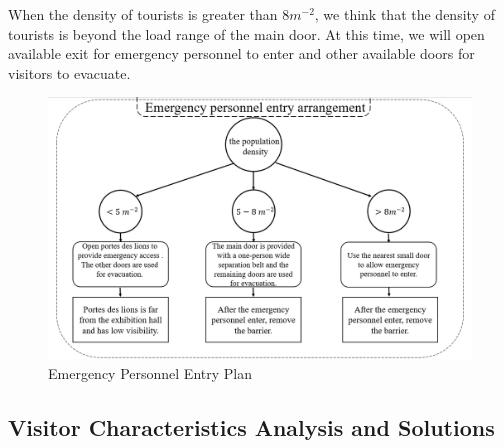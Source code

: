 When the density of tourists is greater than $8m^{-2}$, we think that the density of tourists is beyond the load range of the main door. At this time, we will open available exit for emergency personnel to enter and other available doors for visitors to evacuate.
\begin{figure}[ht]
    \centering
    \includegraphics[scale=0.3]{sun.png}
    \caption{Emergency Personnel Entry Plan}
    \label{1}
\end{figure}







 

\subsection{Visitor Characteristics Analysis and Solutions}

